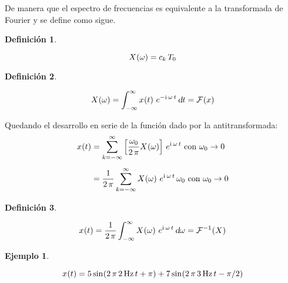 \documentclass[a5paper,12pt,twoside]{book}
\newtheorem{defn}{{Definición}}[chapter]
\newtheorem{example}{{Ejemplo}}[chapter]
\begin{document}
De manera que el espectro de frecuencias es equivalente a la transformada de Fourier y se define como sigue.

\begin{mdframed}[style=MyFrame1]
    \begin{defn}
    \end{defn}
    \begin{equation*}
        \fx[X]{\omega} = c_k \, T_0
    \end{equation*}
\end{mdframed}

\begin{mdframed}[style=MyFrame1]
    \begin{defn}
        \label{defn:FourierTrans}
    \end{defn}
    \begin{equation*}
        \fx[X]{\omega} = \int_{-\infty}^\infty \fx[x]{t} \, e^{-\iu \, \omega \, t} \, \dif t = \fourier{x}
    \end{equation*}
\end{mdframed}

Quedando el desarrollo en serie de la función dado por la antitransformada:
\begin{align*}
    \fx[x]{t} &= \sum_{\kth=-\infty}^\infty \left[ \frac{\omega_0}{2 \, \pi} \fx[X]{\omega} \right] \, e^{\iu \, \omega \, t} \text{ con } \omega_0 \to 0
    \\[1ex]
    &= \frac{1}{2 \, \pi} \sum_{\kth=-\infty}^\infty \fx[X]{\omega} \, e^{\iu \, \omega \, t} \, \omega_0 \text{ con } \omega_0 \to 0
\end{align*}

\begin{mdframed}[style=MyFrame1]
    \begin{defn}
        \label{defn:FourierTransInv}
    \end{defn}
    \begin{equation*}
        \fx[x]{t} = \frac{1}{2 \, \pi} \int_{-\infty}^\infty \fx[X]{\omega} \, e^{\iu \, \omega \, t} \, \dif \omega = \ffourier{X}
    \end{equation*}
\end{mdframed}

\begin{mdframed}[style=MyFrame2]
    \begin{example}
    \end{example}
    \begin{equation*}
        \fx[x]{t} = 5 \fx[\sin]{2 \, \pi \, \SI{2}{\hertz} \, t + \pi} + 7 \fx[\sin]{2 \, \pi \, \SI{3}{\hertz} \, t - \pi/2}
    \end{equation*}
    \begin{center}
        \def\svgwidth{0.6\linewidth}
        
    \end{center}
    \begin{center}
        \def\svgwidth{\linewidth}
        
    \end{center}
\end{mdframed}
\end{document}
